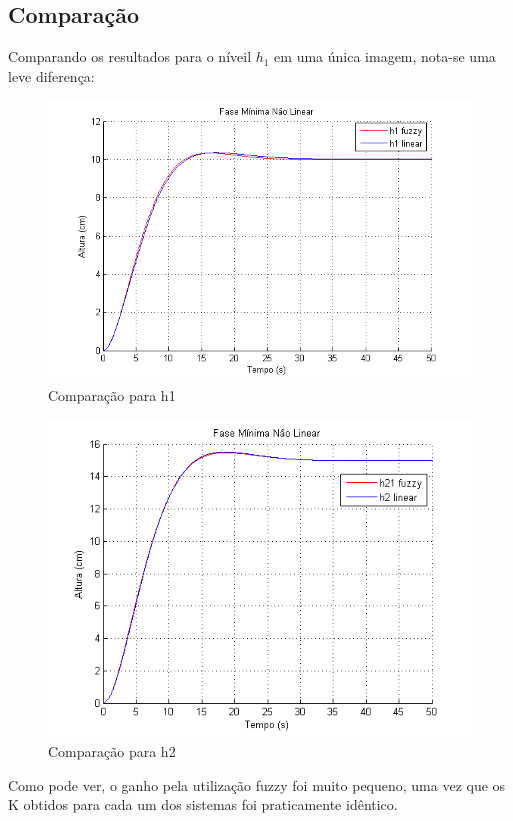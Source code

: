 \documentclass[11pt,]{article}
\begin{document}
	\subsection{Comparação}
	Comparando os resultados para o níveil $h_1$ em uma única imagem, nota-se uma leve diferença:
	\begin{figure}[H]
		\centering
		\includegraphics[scale=1]{h1_comp.png}
		\caption{Comparação para h1}
		\label{h1_comp}
	\end{figure}
	\begin{figure}[H]
		\centering
		\includegraphics[scale=1]{h2_comp.png}
		\caption{Comparação para h2}
		\label{h2_comp}
	\end{figure}

	Como pode ver, o ganho pela utilização fuzzy foi muito pequeno, uma vez que os K obtidos para cada um dos sistemas foi praticamente idêntico.
	
\end{document}
